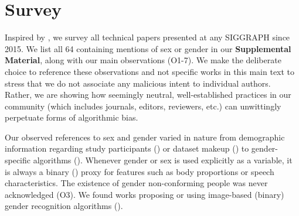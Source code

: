 \documentclass[sigconf,balance=false]{acmart}
\begin{document}
\section{Survey}


Inspired by \citet{keyes2018misgendering}, we survey
all technical papers presented at any SIGGRAPH since 2015. We list all 64 containing mentions of sex or gender in our \textbf{Supplemental Material}, along with our main observations (O1-7). We make the deliberate choice to reference these observations and not specific works in this main text to stress that we do not associate any malicious intent to individual authors. Rather, we are showing how seemingly neutral, well-established practices in our community (which includes journals, editors, reviewers, etc.) can unwittingly perpetuate forms of algorithmic bias.

Our observed references to sex and gender varied in nature from demographic information regarding study participants (\userstudy) or dataset makeup (\dataset) to gender-specific algorithms (\var). Whenever gender or sex is used
explicitly as a variable, it is always a binary (\binary) proxy for features such as body proportions or speech characteristics. The existence of gender non-conforming people was never acknowledged (O3). We found works proposing or using image-based (binary) gender recognition algorithms (\classifier).


\end{document}
